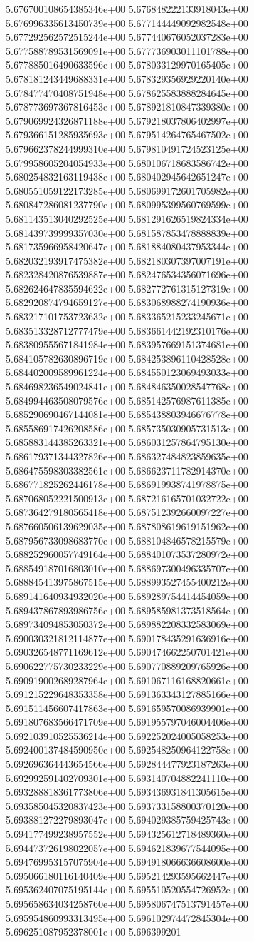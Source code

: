 5.676700108654385346e+00	5.676848222133918043e+00	5.676996335613450739e+00	5.677144449092982548e+00	5.677292562572515244e+00	5.677440676052037283e+00	5.677588789531569091e+00	5.677736903011101788e+00	5.677885016490633596e+00	5.678033129970165405e+00	5.678181243449688331e+00	5.678329356929220140e+00	5.678477470408751948e+00	5.678625583888284645e+00	5.678773697367816453e+00	5.678921810847339380e+00	5.679069924326871188e+00	5.679218037806402997e+00	5.679366151285935693e+00	5.679514264765467502e+00	5.679662378244999310e+00	5.679810491724523125e+00	5.679958605204054933e+00	5.680106718683586742e+00	5.680254832163119438e+00	5.680402945642651247e+00	5.680551059122173285e+00	5.680699172601705982e+00	5.680847286081237790e+00	5.680995399560769599e+00	5.681143513040292525e+00	5.681291626519824334e+00	5.681439739999357030e+00	5.681587853478888839e+00	5.681735966958420647e+00	5.681884080437953344e+00	5.682032193917475382e+00	5.682180307397007191e+00	5.682328420876539887e+00	5.682476534356071696e+00	5.682624647835594622e+00	5.682772761315127319e+00	5.682920874794659127e+00	5.683068988274190936e+00	5.683217101753723632e+00	5.683365215233245671e+00	5.683513328712777479e+00	5.683661442192310176e+00	5.683809555671841984e+00	5.683957669151374681e+00	5.684105782630896719e+00	5.684253896110428528e+00	5.684402009589961224e+00	5.684550123069493033e+00	5.684698236549024841e+00	5.684846350028547768e+00	5.684994463508079576e+00	5.685142576987611385e+00	5.685290690467144081e+00	5.685438803946676778e+00	5.685586917426208586e+00	5.685735030905731513e+00	5.685883144385263321e+00	5.686031257864795130e+00	5.686179371344327826e+00	5.686327484823859635e+00	5.686475598303382561e+00	5.686623711782914370e+00	5.686771825262446178e+00	5.686919938741978875e+00	5.687068052221500913e+00	5.687216165701032722e+00	5.687364279180565418e+00	5.687512392660097227e+00	5.687660506139629035e+00	5.687808619619151962e+00	5.687956733098683770e+00	5.688104846578215579e+00	5.688252960057749164e+00	5.688401073537280972e+00	5.688549187016803010e+00	5.688697300496335707e+00	5.688845413975867515e+00	5.688993527455400212e+00	5.689141640934932020e+00	5.689289754414454059e+00	5.689437867893986756e+00	5.689585981373518564e+00	5.689734094853050372e+00	5.689882208332583069e+00	5.690030321812114877e+00	5.690178435291636916e+00	5.690326548771169612e+00	5.690474662250701421e+00	5.690622775730233229e+00	5.690770889209765926e+00	5.690919002689287964e+00	5.691067116168820661e+00	5.691215229648353358e+00	5.691363343127885166e+00	5.691511456607417863e+00	5.691659570086939901e+00	5.691807683566471709e+00	5.691955797046004406e+00	5.692103910525536214e+00	5.692252024005058253e+00	5.692400137484590950e+00	5.692548250964122758e+00	5.692696364443654566e+00	5.692844477923187263e+00	5.692992591402709301e+00	5.693140704882241110e+00	5.693288818361773806e+00	5.693436931841305615e+00	5.693585045320837423e+00	5.693733158800370120e+00	5.693881272279893047e+00	5.694029385759425743e+00	5.694177499238957552e+00	5.694325612718489360e+00	5.694473726198022057e+00	5.694621839677544095e+00	5.694769953157075904e+00	5.694918066636608600e+00	5.695066180116140409e+00	5.695214293595662447e+00	5.695362407075195144e+00	5.695510520554726952e+00	5.695658634034258760e+00	5.695806747513791457e+00	5.695954860993313495e+00	5.696102974472845304e+00	5.696251087952378001e+00	5.696399201